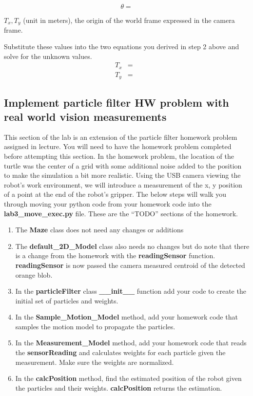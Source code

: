 \begin{enumerate}
	\[
	\theta = 
	\]
	
	$T_x, T_y$ (unit in meters), the origin of the world frame expressed in the camera frame. 
	
	Substitute these values into the two equations you derived in step 2 above and solve for the unknown values.
	\begin{eqnarray*}
		T_x & = & \\
		T_y & = & 	
	\end{eqnarray*}
	
\end{enumerate}

\subsection{Implement particle filter HW problem with real world vision measurements}
This section of the lab is an extension of the particle filter homework problem assigned in lecture.  You will need to have the homework problem completed before attempting this section.  In the homework problem, the location of the turtle was the center of a grid with some additional noise added to the position to make the simulation a bit more realistic.  Using the USB camera viewing the robot’s work environment, we will introduce a measurement of the x, y position of a point at the end of the robot’s gripper.  
The below steps will walk you through moving your python code from your homework code into the \textbf{lab3\_move\_exec.py} file.  These are the “TODO” sections of the homework. 
\begin{enumerate}
\item The \textbf{Maze} class does not need any changes or additions
\item The \textbf{default\_2D\_Model} class also needs no changes but do note that there is a change from the homework with the \textbf{readingSensor} function.  \textbf{readingSensor} is now passed the camera measured centroid of the detected orange blob.  
\item In the \textbf{particleFilter} class \textbf{\_\_init\_\_} function add your code to create the initial set of particles and weights.  
\item In the \textbf{Sample\_Motion\_Model} method, add your homework code that samples the motion model to propagate the particles.
\item In the \textbf{Measurement\_Model} method, add your homework code that reads the \textbf{sensorReading} and calculates weights for each particle given the measurement.  Make sure the weights are normalized.  
\item In the \textbf{calcPosition} method, find the estimated position of the robot given the particles and their weights.  \textbf{calcPosition} returns the estimation.  
\end{enumerate}
